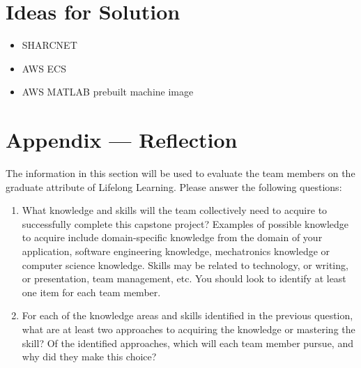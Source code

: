 \documentclass[12pt]{article}
\begin{document}
\section{Ideas for Solution}
\begin{itemize}
    \item SHARCNET
    \item AWS ECS
    \item AWS MATLAB prebuilt machine image
\end{itemize}


\newpage{}
\section*{Appendix --- Reflection}

The information in this section will be used to evaluate the team members on the
graduate attribute of Lifelong Learning.  Please answer the following questions:

\begin{enumerate}
  \item What knowledge and skills will the team collectively need to acquire to
  successfully complete this capstone project?  Examples of possible knowledge
  to acquire include domain-specific knowledge from the domain of your
  application, software engineering knowledge, mechatronics knowledge or
  computer science knowledge.  Skills may be related to technology, or writing,
  or presentation, team management, etc.  You should look to identify at
  least one item for each team member.
  \item For each of the knowledge areas and skills identified in the previous
  question, what are at least two approaches to acquiring the knowledge or
  mastering the skill?  Of the identified approaches, which will each team
  member pursue, and why did they make this choice?
\end{enumerate}
\end{document}
